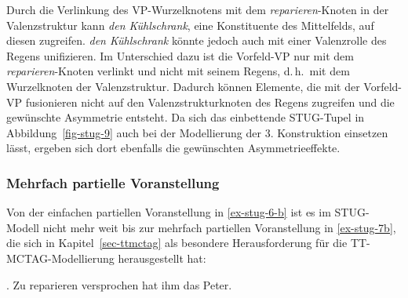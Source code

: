 Durch die Verlinkung des VP-Wurzelknotens mit dem {\it reparieren}-Knoten in der Valenzstruktur kann {\it den Kühlschrank}, eine Konstituente des Mittelfelds, auf diesen zugreifen. {\it den Kühlschrank} könnte jedoch auch mit einer Valenzrolle des Regens unifizieren. Im Unterschied dazu ist die Vorfeld-VP nur mit dem {\it reparieren}-Knoten verlinkt und nicht mit seinem Regens, d.\,h.\ mit dem Wurzelknoten der Valenzstruktur. Dadurch können Elemente, die mit der Vorfeld-VP fusionieren nicht auf den Valenzstrukturknoten des Regens zugreifen und die gewünschte Asymmetrie entsteht. Da sich das einbettende STUG-Tupel in Abbildung~\ref{fig-stug-9} auch bei der Modellierung der 3. Konstruktion einsetzen lässt, ergeben sich dort ebenfalls die gewünschten Asymmetrieeffekte. 

\subsubsection*{Mehrfach partielle Voranstellung}

Von der einfachen partiellen Voranstellung in \ref{ex-stug-6-b} ist es im STUG-Modell nicht mehr weit bis zur mehrfach partiellen Voranstellung in \ref{ex-stug-7b}, die sich in Kapitel~\ref{sec-ttmctag} als besondere Herausforderung für die TT-MCTAG-Modellierung herausgestellt hat:  

\ex. \label{ex-stug-7b} Zu reparieren versprochen hat ihm das Peter.


